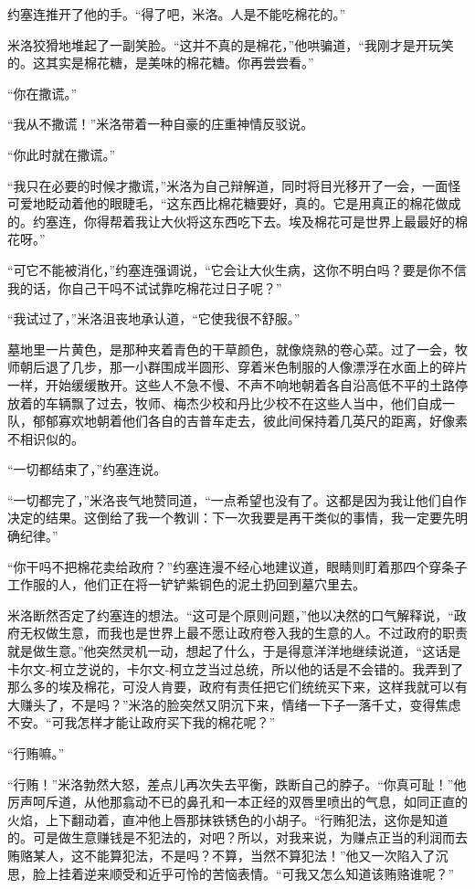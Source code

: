     约塞连推开了他的手。“得了吧，米洛。人是不能吃棉花的。”

    米洛狡猾地堆起了一副笑脸。“这并不真的是棉花，”他哄骗道，“我刚才是开玩笑的。这其实是棉花糖，是美味的棉花糖。你再尝尝看。”

    “你在撒谎。”

    “我从不撒谎！”米洛带着一种自豪的庄重神情反驳说。

    “你此时就在撒谎。”

    “我只在必要的时候才撒谎，”米洛为自己辩解道，同时将目光移开了一会，一面怪可爱地眨动着他的眼睫毛，“这东西比棉花糖要好，真的。它是用真正的棉花做成的。约塞连，你得帮着我让大伙将这东西吃下去。埃及棉花可是世界上最最好的棉花呀。”

    “可它不能被消化，”约塞连强调说，“它会让大伙生病，这你不明白吗？要是你不信我的话，你自己干吗不试试靠吃棉花过日子呢？”

    “我试过了，”米洛沮丧地承认道，“它使我很不舒服。”

    墓地里一片黄色，是那种夹着青色的干草颜色，就像烧熟的卷心菜。过了一会，牧师朝后退了几步，那一小群围成半圆形、穿着米色制服的人像漂浮在水面上的碎片一样，开始缓缓散开。这些人不急不慢、不声不响地朝着各自沿高低不平的土路停放着的车辆飘了过去，牧师、梅杰少校和丹比少校不在这些人当中，他们自成一队，郁郁寡欢地朝着他们各自的吉普车走去，彼此间保持着几英尺的距离，好像素不相识似的。

    “一切都结束了，”约塞连说。

    “一切都完了，”米洛丧气地赞同道，“一点希望也没有了。这都是因为我让他们自作决定的结果。这倒给了我一个教训：下一次我要是再干类似的事情，我一定要先明确纪律。”

    “你干吗不把棉花卖给政府？”约塞连漫不经心地建议道，眼睛则盯着那四个穿条子工作服的人，他们正在将一铲铲紫铜色的泥土扔回到墓穴里去。

    米洛断然否定了约塞连的想法。“这可是个原则问题，”他以决然的口气解释说，“政府无权做生意，而我也是世界上最不愿让政府卷入我的生意的人。不过政府的职责就是做生意。”他突然灵机一动，想起了什么，于是得意洋洋地继续说道，“这话是卡尔文-柯立芝说的，卡尔文-柯立芝当过总统，所以他的话是不会错的。我弄到了那么多的埃及棉花，可没人肯要，政府有责任把它们统统买下来，这样我就可以有大赚头了，不是吗？”米洛的脸突然又阴沉下来，情绪一下子一落千丈，变得焦虑不安。“可我怎样才能让政府买下我的棉花呢？”

    “行贿嘛。”

    “行贿！”米洛勃然大怒，差点儿再次失去平衡，跌断自己的脖子。“你真可耻！”他厉声呵斥道，从他那翕动不已的鼻孔和一本正经的双唇里喷出的气息，如同正直的火焰，上下翻动着，直冲他上唇那抹铁锈色的小胡子。“行贿犯法，这你是知道的。可是做生意赚钱是不犯法的，对吧？所以，对我来说，为赚点正当的利润而去贿赂某人，这不能算犯法，不是吗？不算，当然不算犯法！”他又一次陷入了沉思，脸上挂着逆来顺受和近乎可怜的苦恼表情。“可我又怎么知道该贿赂谁呢？”

